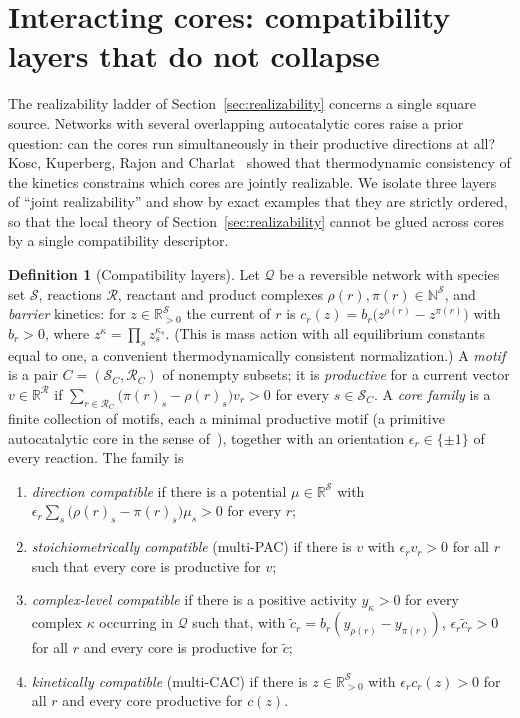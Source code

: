 \documentclass[11pt,reqno]{amsart}
\theoremstyle{plain}
\theoremstyle{definition}
\newtheorem{definition}[theorem]{Definition}
\theoremstyle{remark}
\numberwithin{equation}{section}
\newcommand{\R}{\mathbb{R}}
\newcommand{\N}{\mathbb{N}}
\begin{document}
\section{Interacting cores: compatibility layers that do not collapse}\label{sec:cores}

The realizability ladder of Section~\ref{sec:realizability} concerns a single square source.  Networks with several overlapping autocatalytic cores raise a prior question: can the cores run simultaneously in their productive directions at all?  Kosc, Kuperberg, Rajon and Charlat~\cite{KKRC25} showed that thermodynamic consistency of the kinetics constrains which cores are jointly realizable.  We isolate three layers of ``joint realizability'' and show by exact examples that they are strictly ordered, so that the local theory of Section~\ref{sec:realizability} cannot be glued across cores by a single compatibility descriptor.

\begin{definition}[Compatibility layers]\label{def:layers}
Let $\mathcal Q$ be a reversible network with species set $\mathcal S$, reactions $\mathcal R$, reactant and product complexes $\rho(r),\pi(r)\in\N^{\mathcal S}$, and \emph{barrier} kinetics: for $z\in\R^{\mathcal S}_{>0}$ the current of $r$ is $c_r(z)=b_r\big(z^{\rho(r)}-z^{\pi(r)}\big)$ with $b_r>0$, where $z^{\kappa}=\prod_sz_s^{\kappa_s}$.  (This is mass action with all equilibrium constants equal to one, a convenient thermodynamically consistent normalization.)  A \emph{motif} is a pair $C=(\mathcal S_C,\mathcal R_C)$ of nonempty subsets; it is \emph{productive} for a current vector $v\in\R^{\mathcal R}$ if $\sum_{r\in\mathcal R_C}\big(\pi(r)_s-\rho(r)_s\big)v_r>0$ for every $s\in\mathcal S_C$.  A \emph{core family} is a finite collection of motifs, each a minimal productive motif (a primitive autocatalytic core in the sense of~\cite[Definitions~1--2]{KKRC25}), together with an orientation $\epsilon_r\in\{\pm1\}$ of every reaction.  The family is
\begin{enumerate}[label=(\roman*)]
\item \emph{direction compatible} if there is a potential $\mu\in\R^{\mathcal S}$ with $\epsilon_r\sum_s\big(\rho(r)_s-\pi(r)_s\big)\mu_s>0$ for every $r$;
\item \emph{stoichiometrically compatible} (multi-PAC) if there is $v$ with $\epsilon_rv_r>0$ for all $r$ such that every core is productive for $v$;
\item \emph{complex-level compatible} if there is a positive activity $y_\kappa>0$ for every complex $\kappa$ occurring in $\mathcal Q$ such that, with $\tilde c_r=b_r(y_{\rho(r)}-y_{\pi(r)})$, $\epsilon_r\tilde c_r>0$ for all $r$ and every core is productive for $\tilde c$;
\item \emph{kinetically compatible} (multi-CAC) if there is $z\in\R^{\mathcal S}_{>0}$ with $\epsilon_rc_r(z)>0$ for all $r$ and every core productive for $c(z)$.
\end{enumerate}
\end{definition}
\end{document}
